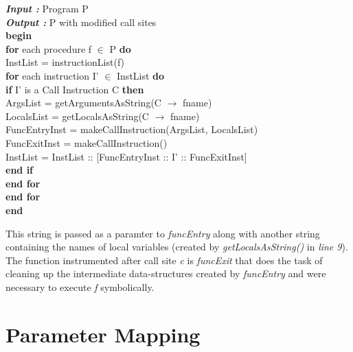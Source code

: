 \documentclass[12pt,oneside]{book}
\begin{document}
\noindent
\textbf{\textit{Input :}} Program P\\
\textbf{\textit{Output :}} P with modified call sites\\
\textbf{begin}\\
\linenumbers
\textbf{for} each procedure f $\in$ P \textbf{do}\\
\hspace*{2mm} InstList = instructionList(f)\\
\hspace*{3mm}\textbf{for} each instruction I' $\in$ InstList \textbf{do}\\
\hspace*{7mm}\textbf{if} I' is a Call Instruction C \textbf{then}\\
\hspace*{11mm}ArgsList = getArgumentsAsString(C $\rightarrow$ fname)\\
\hspace*{11mm}LocalsList = getLocalsAsString(C $\rightarrow$ fname)\\
\hspace*{11mm}FuncEntryInst = makeCallInstruction(ArgsList, LocalsList)\\
\hspace*{11mm}FuncExitInst = makeCallInstruction()\\
\hspace*{11mm}InstList = InstList :: [FuncEntryInst :: I' :: FuncExitInst]\\
\hspace*{7mm}\textbf{end if}\\
\hspace*{3mm}\textbf{end for}\\
\textbf{end for}\\
\textbf{end}

\nolinenumbers

\vspace{0.5cm}
This string is passed as a paramter to \textit{funcEntry} along with another string containing the names of local variables (created by \textit{getLocalsAsString()} in \textit{line 9}).\\
The function instrumented after call site \textit{c} is \textit{funcExit} that does the task of cleaning up the intermediate data-structures created by \textit{funcEntry} and were necessary to execute \textit{f} symbolically.


\newpage

\section{Parameter Mapping}
\end{document}
